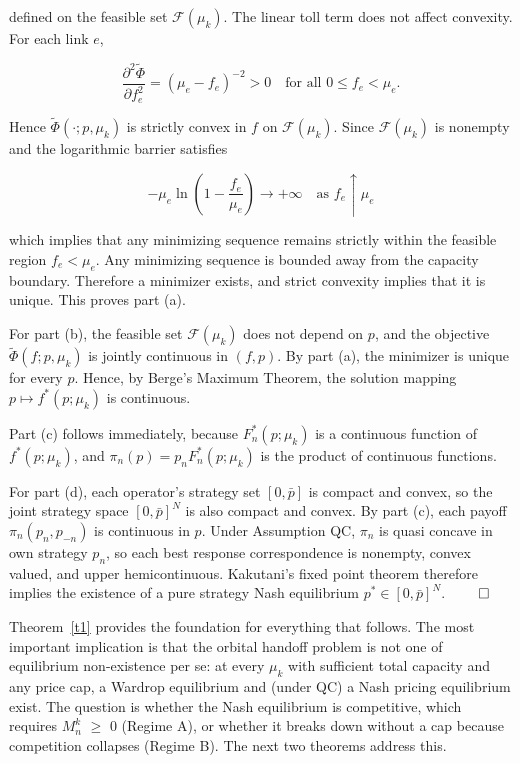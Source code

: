 \documentclass[review,3p,authoryear]{elsarticle}
\begin{document}
defined on the feasible set $\mathscr{F}({\mu}_{k})$. The linear toll term does not affect convexity. For each link $e$,

\begin{equation}
\frac{{\partial}^{2}\tilde{{\Phi}}}{{\partial}f_{e}^{2}}=({\mu}_{e}-f_{e})^{-2}>0 \quad\text{for all } 0\le f_{e}<{\mu}_{e}.
\end{equation}

Hence $\tilde{{\Phi}}({\cdot};p,{\mu}_{k})$ is strictly convex in $f$ on $\mathscr{F}({\mu}_{k})$. Since $\mathscr{F}({\mu}_{k})$ is nonempty and the logarithmic barrier satisfies

\begin{equation}
-{\mu}_{e}\ln\left(1 - \frac{f_{e}}{{\mu}_{e}}\right)\to+\infty \quad\text{as } f_{e}\uparrow{\mu}_{e}
\end{equation}

which implies that any minimizing sequence remains strictly within the feasible region $f_{e}<{\mu}_{e}$. Any minimizing sequence is bounded away from the capacity boundary. Therefore a minimizer exists, and strict convexity implies that it is unique. This proves part (a).

For part (b), the feasible set $\mathscr{F}({\mu}_{k})$ does not depend on $p$, and the objective $\tilde{{\Phi}}(f;p,{\mu}_{k})$ is jointly continuous in $\left(f, p\right)$. By part (a), the minimizer is unique for every $p$. Hence, by Berge's Maximum Theorem, the solution mapping $p{\mapsto}f^{*}(p;{\mu}_{k})$ is continuous.

Part (c) follows immediately, because $F_{n}^{*}(p;{\mu}_{k})$ is a continuous function of $f^{*}(p;{\mu}_{k})$, and ${\pi}_{n}(p)=p_{n}F_{n}^{*}(p;{\mu}_{k})$ is the product of continuous functions.

For part (d), each operator's strategy set $\left[0, \bar{p}\right]$ is compact and convex, so the joint strategy space $[0, \bar{p}]^{N}$ is also compact and convex. By part (c), each payoff ${\pi}_{n}(p_{n},p_{-n})$ is continuous in $p$. Under Assumption QC, ${\pi}_{n}$ is quasi concave in own strategy $p_{n}$, so each best response correspondence is nonempty, convex valued, and upper hemicontinuous. Kakutani's fixed point theorem therefore implies the existence of a pure strategy Nash equilibrium $p^{*}{\in}[0,\bar{p}]^{N}$. $\qed$

Theorem~\ref{t1} provides the foundation for everything that follows. The most important implication is that the orbital handoff problem is not one of equilibrium non-existence per se: at every ${\mu}_{k}$ with sufficient total capacity and any price cap, a Wardrop equilibrium and (under QC) a Nash pricing equilibrium exist. The question is whether the Nash equilibrium is competitive, which requires $M_{n}^{k}$ \ensuremath{\ge} 0 (Regime A), or whether it breaks down without a cap because competition collapses (Regime B). The next two theorems address this.
\end{document}
